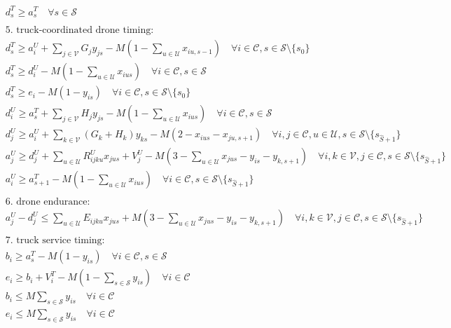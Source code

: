 \documentclass[10pt]{article}
\begin{document}
\[\begin{aligned}
&d^T_s \ge a^T_s \quad \forall s \in \mathcal{S} \\
\\
&\text{5. truck-coordinated drone timing:} \\
&d^T_s \ge a^U_i + \sum_{j \in \mathcal{V}} G_j y_{js} - M\left(1 - \sum_{u \in \mathcal{U}} x_{iu,s-1}\right) \quad \forall i \in \mathcal{C}, s \in \mathcal{S} \setminus \{s_0\} \\
&d^T_s \ge d^U_i - M\left(1 - \sum_{u \in \mathcal{U}} x_{ius}\right) \quad \forall i \in \mathcal{C}, s \in \mathcal{S} \\
&d^T_s \ge e_i - M(1 - y_{is}) \quad \forall i \in \mathcal{C}, s \in \mathcal{S} \setminus \{s_0\} \\
&d^U_i \ge a^T_s + \sum_{j \in \mathcal{V}} H_j y_{js} - M\left(1 - \sum_{u \in \mathcal{U}} x_{ius}\right) \quad \forall i \in \mathcal{C}, s \in \mathcal{S} \\
&d^U_j \ge a^U_i + \sum_{k \in \mathcal{V}} (G_k + H_k) y_{ks} - M(2 - x_{ius} - x_{ju,s+1}) \quad \forall i, j \in \mathcal{C}, u \in \mathcal{U}, s \in \mathcal{S} \setminus \{s_{\hat{S}+1}\} \\
&a^U_j \ge d^U_j + \sum_{u \in \mathcal{U}} R^U_{ijku} x_{jus} + V^U_j - M\left(3 - \sum_{u \in \mathcal{U}} x_{jus} - y_{is} - y_{k,s+1}\right) \quad \forall i, k \in \mathcal{V}, j \in \mathcal{C}, s \in \mathcal{S} \setminus \{s_{\hat{S}+1}\} \\
&a^U_i \ge a^T_{s+1} - M\left(1 - \sum_{u \in \mathcal{U}} x_{ius}\right) \quad \forall i \in \mathcal{C}, s \in \mathcal{S} \setminus \{s_{\hat{S}+1}\} \\
\\
&\text{6. drone endurance:} \\
&a^U_j - d^U_j \le \sum_{u \in \mathcal{U}} E_{ijku} x_{jus} + M\left(3 - \sum_{u \in \mathcal{U}} x_{jus} - y_{is} - y_{k,s+1}\right) \quad \forall i, k \in \mathcal{V}, j \in \mathcal{C}, s \in \mathcal{S} \setminus \{s_{\hat{S}+1}\} \\
\\
&\text{7. truck service timing:} \\
&b_i \ge a^T_s - M(1 - y_{is}) \quad \forall i \in \mathcal{C}, s \in \mathcal{S} \\
&e_i \ge b_i + V^T_i - M\left(1 - \sum_{s \in \mathcal{S}} y_{is}\right) \quad \forall i \in \mathcal{C} \\
&b_i \le M \sum_{s \in \mathcal{S}} y_{is} \quad \forall i \in \mathcal{C} \\
&e_i \le M \sum_{s \in \mathcal{S}} y_{is} \quad \forall i \in \mathcal{C} \\

\end{aligned}\]
\end{document}
